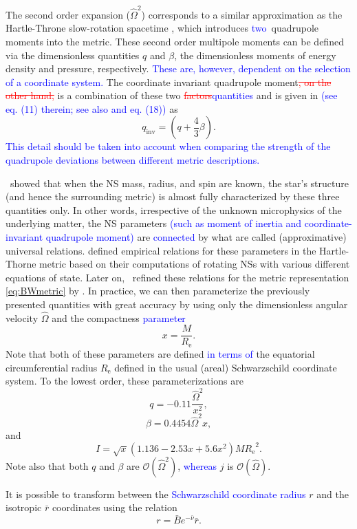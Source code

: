 \documentclass{aa}
\newcommand{\be}{\begin{equation}}
\newcommand{\ee}{\end{equation}}
\newcommand{\refe}[1]{\textcolor{blue}{{#1}}}
\newcommand{\refedel}[1]{\textcolor{red}{\sout{#1}}}
\newcommand{\Req}{\ensuremath{R_{\mathrm{e}}}}
\newcommand{\sch}{Schwarzschild }
\newcommand{\rb}{\ensuremath{\bar{r}}}
\newcommand{\Ob}{\ensuremath{\hat{\Omega}}}
\newcommand{\nub}{\ensuremath{\bar{\nu}}}
\newcommand{\Bb}{\ensuremath{\bar{B}}}
\newcommand{\qinv}{\ensuremath{q_{\mathrm{inv}}}}
\begin{document}
The second order expansion ($\Ob^2$) corresponds to a similar approximation as the Hartle-Throne slow-rotation spacetime \citep{HT68}, which introduces \refe{two} quadrupole moments into the metric.  
These second order multipole moments can be defined via the dimensionless quantities $q$ and $\beta$, the dimensionless moments of energy density and pressure, respectively.
\refe{These are, however, dependent on the selection of a coordinate system.}
The coordinate invariant quadrupole moment\refedel{, on the other hand,} is a combination of these two \refedel{factors}\refe{quantities} and is given in \citet{PA12} \refe{(see eq. (11) therein; see also \citealt{aGM14} and eq. (18))} as
\be
\qinv = \left( q + \frac{4}{3} \beta \right).
\ee
\refe{This detail should be taken into account when comparing the strength of the quadrupole deviations between different metric descriptions.}


\citet{YY13} showed that when the NS mass, radius, and spin are known, the star's structure (and hence the surrounding metric) is almost fully characterized by these three quantities only. %
In other words, irrespective of the unknown microphysics of the underlying matter, the NS parameters \refe{(such as moment of inertia and coordinate-invariant quadrupole moment)} are \refe{connected} by what are called (approximative) universal relations.
\citet{BBP13} defined empirical relations for these parameters in the Hartle-Thorne metric based on their computations of rotating NSs with various different equations of state.
Later on, \citet{aGM14} refined these relations for the metric representation \eqref{eq:BWmetric} by \citet{BI76}.
In practice, we can then parameterize the previously presented quantities with great accuracy by using only the dimensionless angular velocity $\Ob$ and the compactness \refe{parameter}
\be
x = \frac{M}{\Req}.
\ee
Note that both of these parameters are defined \refe{in terms of} the equatorial circumferential radius $\Req$ defined in the usual (areal) \sch coordinate system.
To the lowest order, these parameterizations are \citep{aGM14}
\be\label{eq:quad}
q = -0.11 \frac{\Ob^2}{x^2},
\ee
\be\label{eq:beta}
\beta = 0.4454 \Ob^2 x,
\ee
and
\be\label{eq:I}
I = \sqrt{x} (1.136 - 2.53 x + 5.6 x^2) M \Req^2.
\ee
Note also that both $q$ and $\beta$ are $\mathcal{O}(\Ob^2)$, \refe{whereas} $j$ is $\mathcal{O}(\Ob)$.
    
It is possible to transform between the \refe{\sch coordinate radius} $r$ and the isotropic $\rb$ coordinates using the relation \citep{FIP86}
\be\label{eq:rb2r}
r = \Bb e^{-\nub} \rb.
\ee
\end{document}
